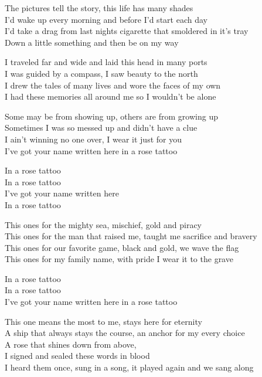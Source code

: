 
\ve{}
The pictures tell the story, this life has many shades\\
I’d wake up every morning and before I’d start each day\\
I’d take a drag from last nights cigarette that smoldered in it’s tray\\
Down a little something and then be on my way

\ve{}
I traveled far and wide and laid this head in many ports\\
I was guided by a compass, I saw beauty to the north\\
I drew the tales of many lives and wore the faces of my own\\
I had these memories all around me so I wouldn’t be alone

\cho{}
Some may be from showing up, others are from growing up\\
Sometimes I was so messed up and didn’t have a clue\\
I ain’t winning no one over, I wear it just for you\\
I’ve got your name written here in a rose tattoo

In a rose tattoo\\
In a rose tattoo\\
I’ve got your name written here\\
In a rose tattoo

\ve{}
This ones for the mighty sea, mischief, gold and piracy\\
This ones for the man that raised me, taught me sacrifice and bravery\\
This ones for our favorite game, black and gold, we wave the flag\\
This ones for my family name, with pride I wear it to the grave

\cho{}

\re{*:}
In a rose tattoo\\
In a rose tattoo\\
I’ve got your name written here in a rose tattoo

\ve{}
This one means the most to me, stays here for eternity\\
A ship that always stays the course, an anchor for my every choice\\
A rose that shines down from above, \\I {}signed and sealed these words in blood\\
I heard them once, sung in a song, it played again and we sang along

